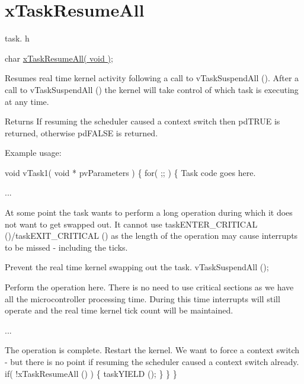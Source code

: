 \hypertarget{group__x_task_resume_all}{\section{x\-Task\-Resume\-All}
\label{group__x_task_resume_all}
}
task. h 
\begin{DoxyPre}char \hyperlink{win32_2win32_2_libraries_2_free_r_t_o_s_2_source_2tasks_8c_ab173f313b22f1a57dfceb98cb01b0508}{xTaskResumeAll( void )};\end{DoxyPre}


Resumes real time kernel activity following a call to v\-Task\-Suspend\-All (). After a call to v\-Task\-Suspend\-All () the kernel will take control of which task is executing at any time.

\begin{DoxyReturn}{Returns}
If resuming the scheduler caused a context switch then pd\-T\-R\-U\-E is returned, otherwise pd\-F\-A\-L\-S\-E is returned.
\end{DoxyReturn}
Example usage\-: 
\begin{DoxyPre}
 void vTask1( void * pvParameters )
 \{
         for( ;; )
         \{
Task code goes here.\end{DoxyPre}



\begin{DoxyPre}...\end{DoxyPre}



\begin{DoxyPre}At some point the task wants to perform a long operation during
which it does not want to get swapped out.  It cannot use
taskENTER\_CRITICAL ()/taskEXIT\_CRITICAL () as the length of the
operation may cause interrupts to be missed - including the
ticks.\end{DoxyPre}



\begin{DoxyPre}Prevent the real time kernel swapping out the task.
                 vTaskSuspendAll ();\end{DoxyPre}



\begin{DoxyPre}Perform the operation here.  There is no need to use critical
sections as we have all the microcontroller processing time.
During this time interrupts will still operate and the real
time kernel tick count will be maintained.\end{DoxyPre}



\begin{DoxyPre}...\end{DoxyPre}



\begin{DoxyPre}The operation is complete.  Restart the kernel.  We want to force
a context switch - but there is no point if resuming the scheduler
caused a context switch already.
                 if( !xTaskResumeAll () )
                 \{
                          taskYIELD ();
                 \}
         \}
 \}
   \end{DoxyPre}
 